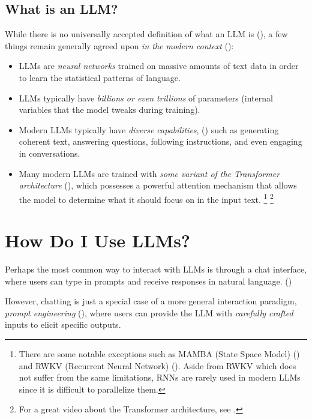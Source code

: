 \documentclass{article} %
\begin{document}
\subsection{What is an LLM?}
While there is no universally accepted definition of what an LLM is (\cite{Zhao-et-al-2023}),
a few things remain generally agreed upon \textit{in the modern context} (\cite{Zhao-et-al-2023, Sanderson-2025, Karpathy-2025}):
\begin{itemize}
    \item LLMs are \textit{neural networks} trained on massive amounts of text data in order to learn the statistical patterns of language.
    \item LLMs typically have \textit{billions or even trillions} of parameters (internal variables that the model tweaks during training).
    \item Modern LLMs typically have \textit{diverse capabilities}, (\cite{Brown-et-al-2020})
        such as generating coherent text, answering questions, following instructions, 
        and even engaging in conversations.
    \item Many modern LLMs are trained with \textit{some variant of the Transformer architecture} (\cite{Vaswani-et-al-2017}),
        which possesses a powerful attention mechanism that allows the model to determine what it should focus on in the input text.
        \footnote{
            There are some notable exceptions such as MAMBA (State Space Model) (\cite{Gu-and-Dao-2024})
            and RWKV (Recurrent Neural Network) (\cite{Peng-et-al-2023}).
            Aside from RWKV which does not suffer from the same limitations, 
            RNNs are rarely used in modern LLMs since it is difficult to parallelize them.
        }
        \footnote{
            For a great video about the Transformer architecture, see \cite{Sanderson-2025}.
        }
\end{itemize}

\section{How Do I Use LLMs?}

Perhaps the most common way to interact with LLMs is through a chat interface,
where users can type in prompts and receive responses in natural language. 
(\cite{ChatGPT-2022,Anthropic-2025,Deepseek-2024})

However, chatting is just a special case of a more general interaction paradigm,
\textit{prompt engineering} (\cite{Karpathy-2025}),
where users can provide the LLM with \textit{carefully crafted} inputs to elicit specific outputs.
\end{document}
